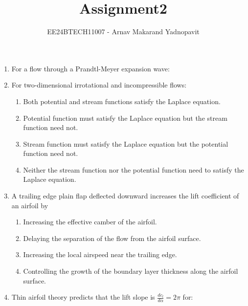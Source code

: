\documentclass[journal,12pt,onecolumn]{IEEEtran}
\theoremstyle{remark}
\begin{document}
\title{Assignment2}
\author{EE24BTECH11007 - Arnav Makarand Yadnopavit}
\maketitle
\renewcommand{\thefigure}{\theenumi}
\renewcommand{\thetable}{\theenumi}
\begin{enumerate}
\item For a flow through a Prandtl-Meyer expansion wave:
\begin{enumerate}
\end{enumerate}
\item For two-dimensional irrotational and incompressible flows:
\begin{enumerate}
\item Both potential and stream functions satisfy the Laplace equation.
\item Potential function must satisfy the Laplace equation but the stream function need not.
\item Stream function must satisfy the Laplace equation but the potential function need not.
\item Neither the stream function nor the potential function need to satisfy the Laplace equation.
\end{enumerate}
\item A trailing edge plain flap deflected downward increases the lift coefficient of an airfoil by
\begin{enumerate}
\item Increasing the effective camber of the airfoil.
\item Delaying the separation of the flow from the airfoil surface.
\item Increasing the local airspeed near the trailing edge.
\item Controlling the growth of the boundary layer thickness along the airfoil surface.
\end{enumerate}
\item Thin airfoil theory predicts that the lift slope is $\frac{dc_l}{d\alpha}=2\pi$ for:
\begin{enumerate}

\end{enumerate}
\end{enumerate}
\end{document}
